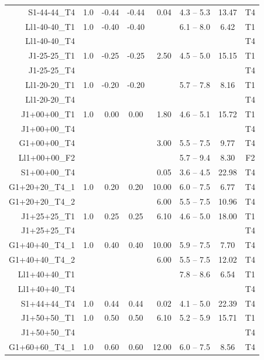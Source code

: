 \documentclass[12pt]{iopart}
\begin{document}
\begin{table}
\begin{indented}
\begin{tabular}{@{}rrrcrrcc}
S1-44-44\_T4 & 1.0  &  -0.44  &  -0.44  &  0.04  &   4.3 -- 5.3  &  13.47  &  T4 
\\
Ll1-40-40\_T1 & 1.0  &  -0.40  &  -0.40  &    &   6.1 -- 8.0  &  6.42  & T1\\
Ll1-40-40\_T4 & & & & & & & T4 \\
J1-25-25\_T1 & 1.0  &  -0.25  &  -0.25  &  2.50  &   4.5 -- 5.0  &  15.15  & 
T1\\
J1-25-25\_T4 & & & & & & & T4 \\
Ll1-20-20\_T1 & 1.0  &  -0.20  &  -0.20  &    &   5.7 -- 7.8  &  8.16  & T1\\
Ll1-20-20\_T4 & & & & & & & T4 \\
J1+00+00\_T1 & 1.0  &  0.00  &  0.00  &  1.80  &   4.6 -- 5.1  &  15.72  & T1\\
J1+00+00\_T4 & & & & & & & T4 \\
G1+00+00\_T4 &   &    &    &  3.00  &  5.5 -- 7.5  &  9.77  &  T4 \\
Ll1+00+00\_F2 &   &    &    &    &  5.7 -- 9.4  &  8.30  &  F2 \\
S1+00+00\_T4 &   &    &    &  0.05  &  3.6 -- 4.5  &  22.98  &  T4 \\
G1+20+20\_T4\_1 & 1.0  &  0.20  &  0.20  &  10.00  &   6.0 -- 7.5  &   6.77  &  
T4 \\ %
G1+20+20\_T4\_2 &      &        &        &   6.00  &   5.5 -- 7.5  &  10.96  &  
T4 \\ %
J1+25+25\_T1 & 1.0  &  0.25  &  0.25  &  6.10  &   4.6 -- 5.0  &  18.00  & T1\\
J1+25+25\_T4 & & & & & & & T4 \\
G1+40+40\_T4\_1 & 1.0  &  0.40  &  0.40  &  10.00  &   5.9 -- 7.5  &   7.70  &  
T4 \\ %
G1+40+40\_T4\_2 &      &        &        &   6.00  &   5.5 -- 7.5  &  12.02  &  
T4 \\ %
Ll1+40+40\_T1 &   &    &    &    &  7.8 -- 8.6  &  6.54  & T1\\
Ll1+40+40\_T4 & & & & & & & T4 \\
S1+44+44\_T4 & 1.0  &  0.44  &  0.44  &  0.02  &   4.1 -- 5.0  &  22.39  &  T4 
\\
J1+50+50\_T1 & 1.0  &  0.50  &  0.50  &  6.10  &   5.2 -- 5.9  &  15.71  & T1\\
J1+50+50\_T4 & & & & & & & T4 \\
G1+60+60\_T4\_1 & 1.0  &  0.60  &  0.60  &  12.00  &   6.0 -- 7.5  & 8.56  &  T4 

\end{tabular}
\end{indented}
\end{table}
\end{document}

